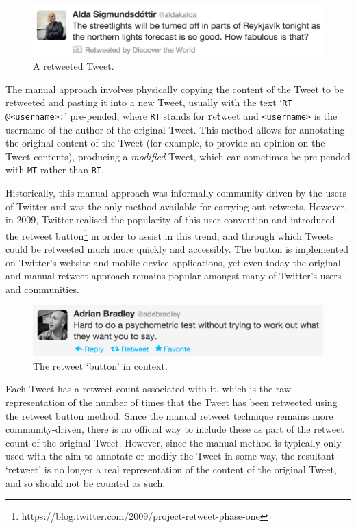 \begin{figure}[h]
\centering
\includegraphics[scale=0.3]{2.Background/Media/northern_lights_tweet.png} 
\caption{A retweeted Tweet.}
\label{fig:northern_lights_tweet}
\end{figure}

The manual approach involves physically copying the content of the Tweet to be retweeted and pasting it into a new Tweet, usually with the text `\texttt{RT @<username>:}' pre-pended, where \texttt{RT} stands for \textbf{r}e\textbf{t}weet and \texttt{<username>} is the username of the author of the original Tweet. This method allows for annotating the original content of the Tweet (for example, to provide an opinion on the Tweet contents), producing a \textit{modified} Tweet, which can sometimes be pre-pended with \texttt{MT} rather than \texttt{RT}.

Historically, this manual approach was informally community-driven by the users of Twitter and was the only method available for carrying out retweets. However, in 2009, Twitter realised the popularity of this user convention and introduced the retweet button\footnote{https://blog.twitter.com/2009/project-retweet-phase-one} in order to assist in this trend, and through which Tweets could be retweeted much more quickly and accessibly. The button is implemented on Twitter's website and mobile device applications, yet even today the original and manual retweet approach remains popular amongst many of Twitter's users and communities.

\begin{figure}[h]
\centering
\includegraphics[scale=0.3]{2.Background/Media/retweet_button.png} 
\caption{The retweet `button' in context.}
\label{fig:retweet_button}
\end{figure}

Each Tweet has a retweet count associated with it, which is the raw representation of the number of times that the Tweet has been retweeted using the retweet button method. Since the manual retweet technique remains more community-driven, there is no official way to include these as part of the retweet count of the original Tweet. However, since the manual method is typically only used with the aim to annotate or modify the Tweet in some way, the resultant `retweet'  is no longer a real representation of the content of the original Tweet, and so should not be counted as such.

